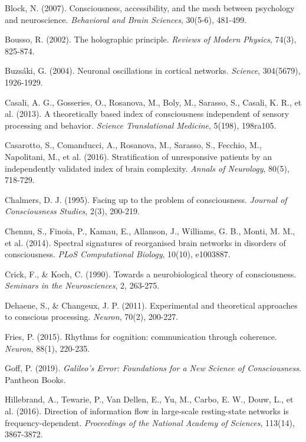 \documentclass[12pt]{article}
\begin{document}
\begin{thebibliography}{99}
     Block, N. (2007). Consciousness, accessibility, and the mesh between psychology and neuroscience. \emph{Behavioral and Brain Sciences}, 30(5-6), 481-499.
    
     Bousso, R. (2002). The holographic principle. \emph{Reviews of Modern Physics}, 74(3), 825-874.
    
     Buzsáki, G. (2004). Neuronal oscillations in cortical networks. \emph{Science}, 304(5679), 1926-1929.
    
     Casali, A. G., Gosseries, O., Rosanova, M., Boly, M., Sarasso, S., Casali, K. R., et al. (2013). A theoretically based index of consciousness independent of sensory processing and behavior. \emph{Science Translational Medicine}, 5(198), 198ra105.
    
     Casarotto, S., Comanducci, A., Rosanova, M., Sarasso, S., Fecchio, M., Napolitani, M., et al. (2016). Stratification of unresponsive patients by an independently validated index of brain complexity. \emph{Annals of Neurology}, 80(5), 718-729.
    
     Chalmers, D. J. (1995). Facing up to the problem of consciousness. \emph{Journal of Consciousness Studies}, 2(3), 200-219.
    
     Chennu, S., Finoia, P., Kamau, E., Allanson, J., Williams, G. B., Monti, M. M., et al. (2014). Spectral signatures of reorganised brain networks in disorders of consciousness. \emph{PLoS Computational Biology}, 10(10), e1003887.
    
     Crick, F., \& Koch, C. (1990). Towards a neurobiological theory of consciousness. \emph{Seminars in the Neurosciences}, 2, 263-275.
    
     Dehaene, S., \& Changeux, J. P. (2011). Experimental and theoretical approaches to conscious processing. \emph{Neuron}, 70(2), 200-227.
    
     Fries, P. (2015). Rhythms for cognition: communication through coherence. \emph{Neuron}, 88(1), 220-235.
    
     Goff, P. (2019). \emph{Galileo's Error: Foundations for a New Science of Consciousness}. Pantheon Books.
    
     Hillebrand, A., Tewarie, P., Van Dellen, E., Yu, M., Carbo, E. W., Douw, L., et al. (2016). Direction of information flow in large-scale resting-state networks is frequency-dependent. \emph{Proceedings of the National Academy of Sciences}, 113(14), 3867-3872.
    

\end{thebibliography}
\end{document}

